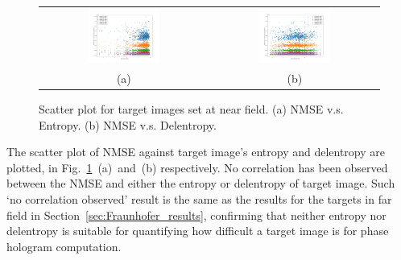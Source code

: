 	\begin{figure} [ht]
		\begin{center}
			\begin{tabular}{c c}
				\includegraphics[trim={80 50 90 70}, clip, width = 0.45\textwidth]{GS_Fresnel0.1_NMSE_VS_Entropy.png} &
				\includegraphics[trim={80 50 90 70}, clip, width = 0.45\textwidth]{GS_Fresnel0.1_NMSE_VS_Delentropy.png} \\
				(a) & (b)
			\end{tabular}
			\caption{\label{fig:GS_Fresnel0.1_NMSE_VS_Entropy_Delentropy} Scatter plot for target images set at near field. (a) NMSE v.s. Entropy. (b) NMSE v.s. Delentropy.}
		\end{center}
	\end{figure}

	The scatter plot of NMSE against target image's entropy and delentropy are plotted, in Fig.~\ref{fig:GS_Fresnel0.1_NMSE_VS_Entropy_Delentropy}~(a)~and~(b) respectively. No correlation has been observed between the NMSE and either the entropy or delentropy of target image. Such `no correlation observed' result is the same as the results for the targets in far field in Section~\ref{sec:Fraunhofer_results}, confirming that neither entropy nor delentropy is suitable for quantifying how difficult a target image is for phase hologram computation.

